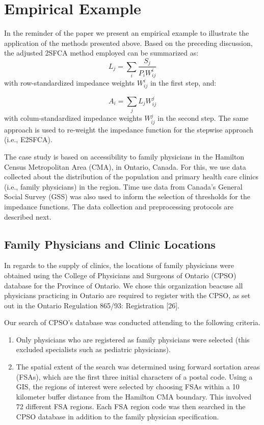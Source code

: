 \documentclass[10pt,letterpaper]{article}
\begin{document}
\section{Empirical Example}\label{empirical-example}

In the reminder of the paper we present an empirical example to
illustrate the application of the methods presented above. Based on the
preceding discussion, the adjusted 2SFCA method employed can be
summarized as: \[
L_{j}=\sum_i\frac{S_j}{P_iW_{ij}^{i}}
\] with row-standardized impedance weights \(W_{ij}^i\) in the first
step, and:

\[
A_i = \sum_j{L_jW_{ij}^{j}}
\] with colum-standardized impedance weights \(W_{ij}^j\) in the second
step. The same approach is used to re-weight the impedance function for
the stepwise approach (i.e., E2SFCA).

The case study is based on accessibility to family physicians in the
Hamilton Census Metropolitan Area (CMA), in Ontario, Canada. For this,
we use data collected about the distribution of the population and
primary health care clinics (i.e., family physicians) in the region.
Time use data from Canada's General Social Survey (GSS) was also used to
inform the selection of thresholds for the impedance functions. The data
collection and preprocessing protocols are described next.

\subsection{Family Physicians and Clinic
Locations}\label{family-physicians-and-clinic-locations}

In regards to the supply of clinics, the locations of family physicians
were obtained using the College of Physicians and Surgeons of Ontario
(CPSO) database for the Province of Ontario. We chose this organization
beacuse all physicians practicing in Ontario are required to register
with the CPSO, as set out in the Ontario Regulation 865/93: Registration
{[}26{]}.

Our search of CPSO's database was conducted attending to the following
criteria.

\begin{enumerate}
\def\labelenumi{\arabic{enumi})}
\item
  Only physicians who are registered as family physicians were selected
  (this excluded specialists such as pediatric physicians).
\item
  The spatial extent of the search was determined using forward
  sortation areas (FSAs), which are the first three initial characters
  of a postal code. Using a GIS, the regions of interest were selected
  by choosing FSAs within a 10 kilometer buffer distance from the
  Hamilton CMA boundary. This involved 72 different FSA regions. Each
  FSA region code was then searched in the CPSO database in addition to
  the family physician specification.
\end{enumerate}
\end{document}
